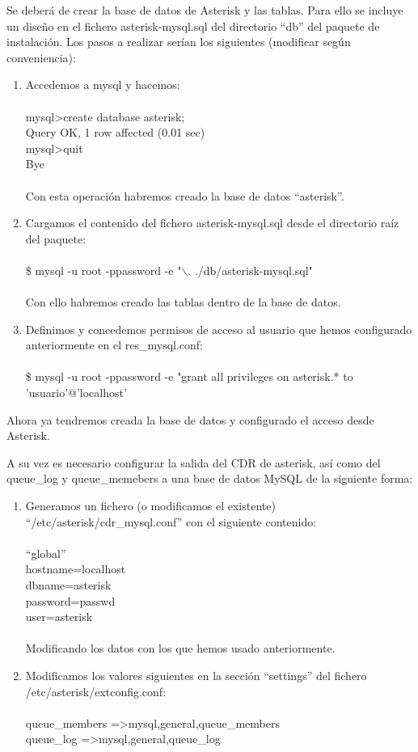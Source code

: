 \documentclass[spanish,12pt]{book}
\begin{document}
Se deberá de crear la base de datos de Asterisk y las tablas. Para ello se incluye un diseño en el fichero asterisk-mysql.sql del directorio ``db'' del paquete de instalación. Los pasos a realizar serían los siguientes (modificar según conveniencia):
\begin{enumerate}
\item Accedemos a mysql y hacemos:\\\\mysql\textgreater create database asterisk;\\Query OK, 1 row affected (0.01 sec)\\mysql\textgreater quit\\Bye\\\\Con esta operación habremos creado la base de datos ``asterisk''.
\item Cargamos el contenido del fichero asterisk-mysql.sql desde el directorio raíz del paquete:\\\\\$ mysql -u root -ppassword -e "$\backslash$. ./db/asterisk-mysql.sql"\\\\Con ello habremos creado las tablas dentro de la base de datos.
\item Definimos y concedemos permisos de acceso al usuario que hemos configurado anteriormente en el res\_mysql.conf:\\\\\$ mysql -u root -ppassword -e "grant all privileges on asterisk.* to 'usuario'@'localhost'
\end{enumerate}

Ahora ya tendremos creada la base de datos y configurado el acceso desde Asterisk.

A su vez es necesario configurar la salida del CDR de asterisk, así como del queue\_log y queue\_memebers a una base de datos MySQL de la siguiente forma:
\begin{enumerate}
\item Generamos un fichero (o modificamos el existente) ``/etc/asterisk/cdr\_mysql.conf'' con el siguiente contenido:\\\\``global''\\hostname=localhost\\dbname=asterisk\\password=passwd\\user=asterisk\\\\Modificando los datos con los que hemos usado anteriormente.
\item Modificamos los valores siguientes en la sección ``settings'' del fichero /etc/asterisk/extconfig.conf:\\\\queue\_members =\textgreater mysql,general,queue\_members\\queue\_log =\textgreater mysql,general,queue\_log
\end{enumerate}
\end{document}
